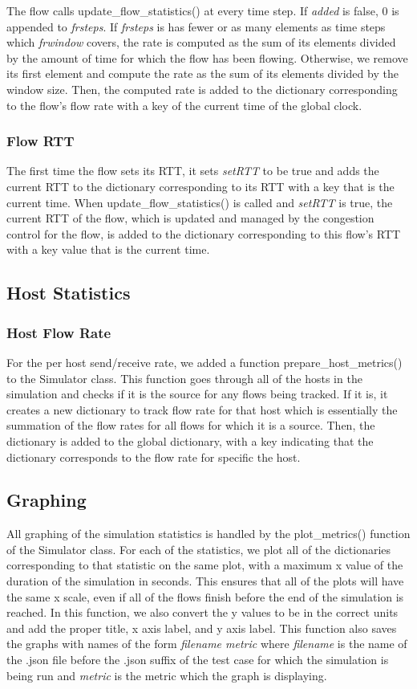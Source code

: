 \documentclass{article}
\begin{document}
The flow calls update\_flow\_statistics() at every time step. If {\em added} is false, 0  is appended to {\em frsteps}. If {\em frsteps} is has fewer or as many elements as time steps which {\em frwindow} covers, the rate is computed as the sum of its elements divided by the amount of time for which the flow has been flowing. Otherwise, we remove its first element and compute the rate as the sum of its elements divided by the window size. Then, the computed rate is added to the dictionary corresponding to the flow's flow rate with a key of the current time of the global clock.

\subsubsection{Flow RTT}
The first time the flow sets its RTT, it sets {\em setRTT} to be true and adds the current RTT to the dictionary corresponding to its RTT with a key that is the current time. When update\_flow\_statistics() is called and {\em setRTT} is true, the current RTT of the flow, which is updated and managed by the congestion control for the flow, is added to the dictionary corresponding to this flow's RTT with a key value that is the current time. 

\subsection{Host Statistics}
\subsubsection{Host Flow Rate}
For the per host send/receive rate, we added a function prepare\_host\_metrics() to the Simulator class. This function goes through all of the hosts in the simulation and checks if it is the source for any flows being tracked. If it is, it creates a new dictionary to track flow rate for that host which is essentially the summation of the flow rates for all flows for which it is a source. Then, the dictionary is added to the global dictionary, with a key indicating that the dictionary corresponds to the flow rate for specific the host. 

\subsection{Graphing}
All graphing of the simulation statistics is handled by the plot\_metrics() function of the Simulator class. For each of the statistics, we plot all of the dictionaries corresponding to that statistic on the same plot, with a maximum x value of the duration of the simulation in seconds. This ensures that all of the plots will have the same x scale, even if all of the flows finish before the end of the simulation is reached. In this function, we also convert the y values to be in the correct units and add the proper title, x axis label, and y axis label. This function also saves the graphs with names of the form {\em filename metric} where {\em filename} is the name of the .json file before the .json suffix of the test case for which the simulation is being run and {\em metric} is the metric which the graph is displaying. 
\end{document}
